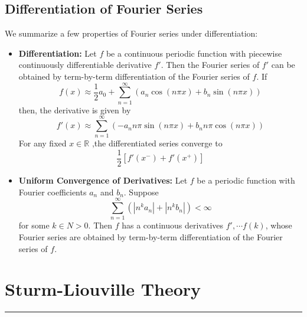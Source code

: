 \documentclass[11pt]{article}
\newcommand{\R}{\mathbb{R}}
\begin{document}
\subsection{Differentiation of Fourier Series}
We summarize a few properties of Fourier series under differentiation:
\begin{itemize}
\item \textbf{Differentiation:} Let $f$ be a continuous periodic function with piecewise continuously differentiable derivative $f'$. Then the Fourier series of $f'$ can be obtained by term-by-term differentiation of the Fourier series of $f$. If$$ f(x) \approx \frac{1}{2} a_0 + \sum_{n=1}^{\infty} \left( a_n \cos (n\pi x) + b_n \sin (n\pi x) \right)$$ then, the derivative is given by
$$ f'(x) \approx  \sum_{n=1}^{\infty} \left( -a_n n \pi \sin (n\pi x) + b_n n\pi \cos (n\pi x) \right)$$
For any fixed $x \in \R$ ,the differentiated series converge to 
$$\frac{1}{2} \left [f'(x^-)+f'(x^+) \right]$$
\item \textbf{Uniform Convergence of Derivatives:} Let $f$ be a periodic function with Fourier coefficients $a_n$ and $b_n$. Suppose
$$ \sum_{n=1}^{\infty} \left( |n^ka_n| + |n^kb_n| \right) < \infty $$
for some $k \in N>0$. Then $f$ has a continuous derivatives $f',  \cdots f(k)$, whose Fourier series are obtained by term-by-term differentiation of the Fourier series of $f$.
\end{itemize}

\pagebreak


\section{Sturm-Liouville Theory}
\hrule \vspace{15pt}
\end{document}
